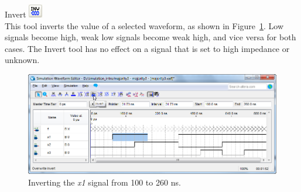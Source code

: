 \documentclass[11pt, twoside, pdftex]{article}
\begin{document}
\begin{description}
	\item {\sf Invert} \hbox{\includegraphics[scale=0.7]{figures/appendix/icon9.png}}\\
	This tool inverts the value of a selected waveform, as shown in Figure~\ref{fig:fig9}. Low signals become high, weak low 
	signals become weak high, and vice versa for both cases. The {\sf Invert} tool has no effect on a signal that is set to 
	high impedance or unknown.
	\begin{figure}[H]
	   \begin{center}
	      \includegraphics[scale=0.65]{figures/appendix/figure9.png}
	   \caption{Inverting the {\it x1} signal from 100 to 260 ns.} 
		 \label{fig:fig9}
		 \end{center}
	\end{figure}


\end{description}
\end{document}
